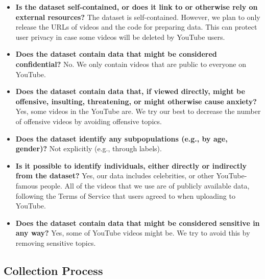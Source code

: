 \begin{itemize}
\item \textbf{Is the dataset self-contained, or does it link to or otherwise rely on external resources?}
The dataset is self-contained. However, we plan to only release the URLs of videos and the code for preparing data. This can protect user privacy in case some videos will be deleted by YouTube users.

\item \textbf{Does the dataset contain data that might be considered confidential?}
No. We only contain videos that are public to everyone on YouTube.

\item \textbf{Does the dataset contain data that, if viewed directly, might be offensive, insulting, threatening, or might otherwise cause anxiety?}
Yes, some videos in the YouTube are. We try our best to decrease the number of offensive videos by avoiding offensive topics.

\item \textbf{Does the dataset identify any subpopulations (e.g., by age, gender)?} 
Not explicitly (e.g., through labels).

\item \textbf{Is it possible to identify individuals, either directly or indirectly from the dataset?} 
Yes, our data includes celebrities, or other YouTube-famous people. All of the videos that we use are of publicly available data, following the Terms of Service that users agreed to when uploading to YouTube.

\item \textbf{Does the dataset contain data that might be considered sensitive in any way?}
Yes, some of YouTube videos might be. We try to avoid this by removing sensitive topics.

\end{itemize}

\subsection{Collection Process}

